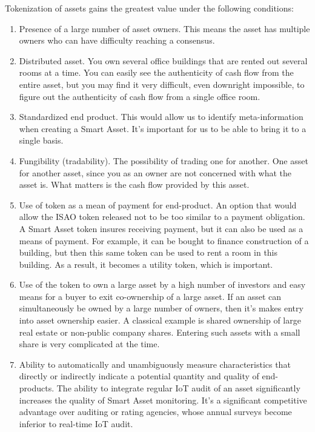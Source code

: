 \documentclass{article}
\begin{document}
\begin{multicols}{2}
Tokenization of assets gains the greatest value under the following conditions:

\begin{enumerate}[label=(\alph*)]
\item Presence of a large number of asset owners. This means the asset has multiple owners who can have difficulty reaching a consensus. 
\item Distributed asset. You own several office buildings that are rented out several rooms at a time. You can easily see the authenticity of cash flow from the entire asset, but you may find it very difficult, even downright impossible, to figure out the authenticity of cash flow from a single office room. 
\item Standardized end product. This would allow us to identify meta-information when creating a Smart Asset. It’s important for us to be able to bring it to a single basis. 
\item Fungibility (tradability). The possibility of trading one for another. One asset for another asset,  since you as an owner are not concerned with what the asset is. What matters is the cash flow provided by this asset.
\item Use of token as a mean of payment for end-product. An option that would allow the ISAO token released not to be too similar to a payment obligation. A Smart Asset token insures receiving payment, but it can also be used as a means of payment. For example, it can be bought to finance construction of a building, but then this same token can be used to rent a room in this building. As a result, it becomes a utility token, which is important. 
\item Use of the token to own a large asset by a high number of investors and easy means for a buyer to exit co-ownership of a large asset. If an asset can simultaneously be owned by a large number of owners, then it’s makes entry into asset ownership easier. A classical example is shared ownership of large real estate or non-public company shares. Entering such assets with a small share is very complicated at the time.
\item Ability to automatically and unambiguously measure characteristics that directly or indirectly 
indicate a potential quantity and quality of end-products. The ability to integrate regular IoT audit of an asset significantly increases the quality of Smart Asset monitoring. It’s a significant competitive advantage over auditing or rating agencies, whose annual surveys become inferior to real-time IoT audit. 

\end{enumerate}
\end{multicols}
\end{document}
